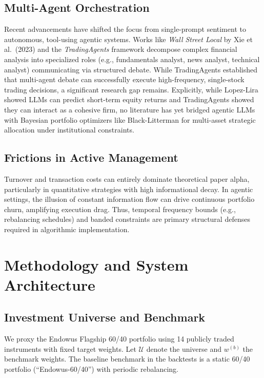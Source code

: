 \documentclass[12pt]{report}
\begin{document}
\section{Multi-Agent Orchestration}
Recent advancements have shifted the focus from single-prompt sentiment to autonomous, tool-using agentic systems. Works like \emph{Wall Street Local} by Xie et al.\ (2023) \cite{xie2023} and the \emph{TradingAgents} framework \cite{tradingagents} decompose complex financial analysis into specialized roles (e.g., fundamentals analyst, news analyst, technical analyst) communicating via structured debate.
While TradingAgents established that multi-agent debate can successfully execute high-frequency, single-stock trading decisions, a significant research gap remains. Explicitly, while Lopez-Lira showed LLMs can predict short-term equity returns and TradingAgents showed they can interact as a cohesive firm, no literature has yet bridged agentic LLMs with Bayesian portfolio optimizers like Black-Litterman for multi-asset strategic allocation under institutional constraints.

\section{Frictions in Active Management}
Turnover and transaction costs can entirely dominate theoretical paper alpha, particularly in quantitative strategies with high informational decay.
In agentic settings, the illusion of constant information flow can drive continuous portfolio churn, amplifying execution drag. Thus, temporal frequency bounds (e.g., rebalancing schedules) and banded constraints are primary structural defenses required in algorithmic implementation.

\chapter{Methodology and System Architecture}
\section{Investment Universe and Benchmark}
We proxy the Endowus Flagship 60/40 portfolio using 14 publicly traded instruments with fixed target weights.
Let $\mathcal{U}$ denote the universe and $w^{(b)}$ the benchmark weights.
The baseline benchmark in the backtests is a static 60/40 portfolio (``Endowus-60/40'') with periodic rebalancing.
\end{document}
